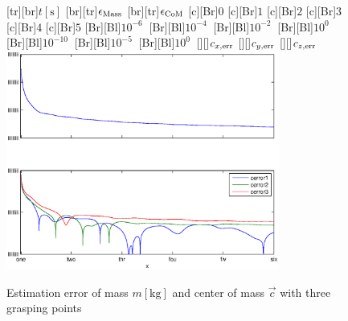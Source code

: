 \begin{figure}
	\centering	
	[tr][br]{$t\left[\mathrm{s}\right]$}
	[br][tr]{$\epsilon_{\mathrm{Mass}}$}
	[br][tr]{$\epsilon_{\mathrm{CoM}}$}
	[Br]{$0$}
	[Br]{$1$}
	[Br]{$2$}
	[Br]{$3$}
	[Br]{$4$}
	[Br]{$5$}
	[Br][Bl]{$10^{-6}\  $}
	[Br][Bl]{$10^{-4}\  $}
	[Br][Bl]{$10^{-2}\  $}
	[Br][Bl]{$10^0\  $}
	[Br][Bl]{$10^{-10}\  $}
	[Br][Bl]{$10^{-5}\  $}
	[Br][Bl]{$10^0\  $}
	[][]{\tiny $c_{x,\mathrm{err}}$}
	[][]{\tiny $c_{y,\mathrm{err}}$}
	[][]{\tiny $c_{z,\mathrm{err}}$}
	\includegraphics[width=0.8\textwidth]{figures/mass_multi.eps}
	\vspace{0.2cm}
	\caption[Mass error, three grasping points]{Estimation error of mass $m \left[\mathrm{kg}\right]$ and center of mass $\vec{c}$ with three grasping points}
	\label{fig:estim_mass_multi}
\end{figure}

